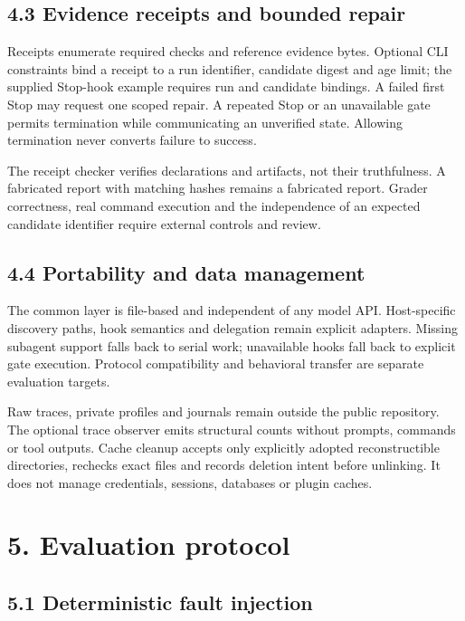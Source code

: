 \documentclass[
  11pt,
]{article}
\begin{document}
\subsection{4.3 Evidence receipts and bounded
repair}\label{evidence-receipts-and-bounded-repair}

Receipts enumerate required checks and reference evidence bytes.
Optional CLI constraints bind a receipt to a run identifier, candidate
digest and age limit; the supplied Stop-hook example requires run and
candidate bindings. A failed first Stop may request one scoped repair. A
repeated Stop or an unavailable gate permits termination while
communicating an unverified state. Allowing termination never converts
failure to success.

The receipt checker verifies declarations and artifacts, not their
truthfulness. A fabricated report with matching hashes remains a
fabricated report. Grader correctness, real command execution and the
independence of an expected candidate identifier require external
controls and review.

\subsection{4.4 Portability and data
management}\label{portability-and-data-management}

The common layer is file-based and independent of any model API.
Host-specific discovery paths, hook semantics and delegation remain
explicit adapters. Missing subagent support falls back to serial work;
unavailable hooks fall back to explicit gate execution. Protocol
compatibility and behavioral transfer are separate evaluation targets.

Raw traces, private profiles and journals remain outside the public
repository. The optional trace observer emits structural counts without
prompts, commands or tool outputs. Cache cleanup accepts only explicitly
adopted reconstructible directories, rechecks exact files and records
deletion intent before unlinking. It does not manage credentials,
sessions, databases or plugin caches.

\section{5. Evaluation protocol}\label{evaluation-protocol}

\subsection{5.1 Deterministic fault
injection}\label{deterministic-fault-injection}
\end{document}
